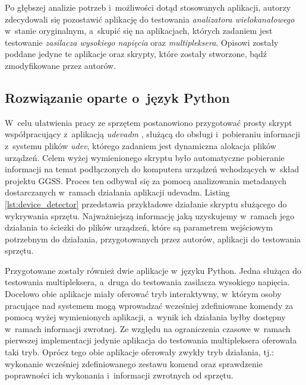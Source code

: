 Po głębszej analizie potrzeb i~możliwości dotąd stosowanych aplikacji, autorzy zdecydowali się pozostawić aplikację do testowania \emph{analizatora wielokanałowego} w~stanie oryginalnym, a~skupić się na aplikacjach, których zadaniem jest testowanie \emph{zasilacza wysokiego napięcia} oraz \emph{multipleksera}. Opisowi zostały poddane jedyne te aplikacje oraz skrypty, które zostały stworzone, bądź zmodyfikowane przez autorów.

\subsection{Rozwiązanie oparte o~język Python}
W~celu ułatwienia pracy ze sprzętem postanowiono przygotować prosty skrypt współpracujący z~aplikacją \emph{udevadm} \cite{udevadm}, służącą do obsługi i~pobieraniu informacji z~systemu plików \emph{udev}, którego zadaniem jest dynamiczna alokacja plików urządzeń. Celem wyżej wymienionego skryptu było automatyczne pobieranie informacji na temat podłączonych do komputera urządzeń wchodzących w~skład projektu GGSS. Proces ten odbywał się za pomocą analizowania metadanych dostarczanych w~ramach działania aplikacji udevadm. Listing \ref{lst:device_detector} przedstawia przykładowe działanie skryptu służącego do wykrywania sprzętu. Najważniejszą informację jaką uzyskujemy w~ramach jego działania to ścieżki do plików urządzeń, które są parametrem wejściowym potrzebnym do działania, przygotowanych przez autorów, aplikacji do testowania sprzętu.



Przygotowane zostały również dwie aplikacje w~języku Python. Jedna służąca do testowania multipleksera, a~druga do testowania zasilacza wysokiego napięcia. Docelowo obie aplikacje miały oferować tryb interaktywny, w~którym osoby pracujące nad systemem mogą wprowadzać wcześniej zdefiniowane komendy za pomocą wyżej wymienionych aplikacji, a~wynik ich działania byłby dostępny w~ramach informacji zwrotnej. Ze względu na ograniczenia czasowe w~ramach pierwszej implementacji jedynie aplikacja do testowania multipleksera oferowała taki tryb. Oprócz tego obie aplikacje oferowały zwykły tryb działania, tj.: wykonanie wcześniej zdefiniowanego zestawu komend oraz sprawdzenie poprawności ich wykonania i~informacji zwrotnych od sprzętu.

